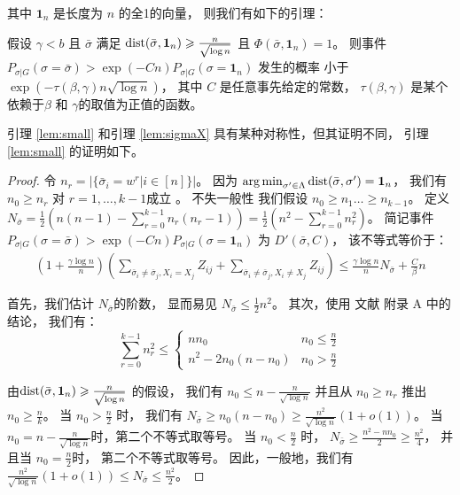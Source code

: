 其中 $\mathbf{1}_n$
是长度为 $n$ 的全1的向量，
则我们有如下的引理：
 \begin{lemma}\label{lem:small}
	假设 $\gamma < b $ 且 $\bar{\sigma}$
  满足 
  $\operatorname{dist}(\bar{\sigma}, \mathbf{1}_n) \geqslant \frac{n}{\sqrt{\log  n}}$
	且 $\Phi(\bar{\sigma}, \mathbf{1}_n)=1$。
	则事件
	$P_{\sigma | G}(\sigma = \bar{\sigma} ) > \exp(-Cn) P_{\sigma | G}(\sigma = \mathbf{1}_n)$
	发生的概率 小于 $\exp(-\tau(\beta, \gamma) n \sqrt{\log  n} )$，
  其中 $C$ 是任意事先给定的常数，
  $\tau(\beta, \gamma)$ 是某个依赖于$\beta$ 和 $\gamma$的取值为正值的函数。
\end{lemma}
引理 \ref{lem:small} 和引理 \ref{lem:sigmaX}  具有某种对称性，但其证明不同，
引理 \ref{lem:small} 的证明如下。
\begin{proof}
	令 $n_r = |\{\bar{\sigma}_i = w^r | i\in [n] \}|$。
  因为 $\operatorname*{arg\,min}_{\sigma'\in \Lambda} \operatorname{dist}(\bar{\sigma}, \sigma') = \mathbf{1}_n$，
  我们有 $n_0 \geq n_r$ 对 $r=1, \dots, k-1$成立 
  。
	不失一般性 我们假设 \mbox{$n_0 \geq n_1 \dots \geq n_{k-1}$}。
	定义
  $N_{\bar{\sigma}} = \frac{1}{2}(n(n-1) - \sum_{r=0}^{k-1} n_r(n_r-1))
	=\frac{1}{2}(n^2 - \sum_{r=0}^{k-1} n_r^2)$。
	简记事件
  $P_{\sigma | G}(\sigma = \bar{\sigma} ) > \exp(-Cn) P_{\sigma | G}(\sigma = \mathbf{1}_n)$ 为
  $D'(\bar{\sigma}, C)$，
	该不等式等价于：
\begin{align}
	\left(1 + \frac{\gamma \log n}{n}\right)
	\left( \sum_{\bar{\sigma}_i  \neq \bar{\sigma}_j, X_i = X_j} Z_{ij} +
	\sum_{\bar{\sigma}_i  \neq \bar{\sigma}_j, X_i \neq X_j} Z_{ij} \right)
	\leq \frac{\gamma \log n}{n} N_{\bar{\sigma}} + \frac{C}{\beta} n\label{eq:small}
\end{align}
		
	首先，我们估计 $N_{\bar{\sigma}}$的阶数，
  显而易见 $N_{\bar{\sigma}} \leq \frac{1}{2} n^2$。
	其次，使用 文献 附录 A 中的结论，
  我们有：
\begin{equation}
	\sum_{r=0}^{k-1} n_r^2 \leq
	\begin{cases}
	n n_0 & n_0 \leq \frac{n}{2} \\
	n^2 - 2n_0(n-n_0) & n_0 > \frac{n}{2}
	\end{cases}
	\end{equation}
	
	由$\operatorname{dist}(\bar{\sigma}, \mathbf{1}_n) \geqslant \frac{n}{\sqrt{\log n}}$
  的假设，
  我们有 $n_0 \leq n - \frac{n}{\sqrt{\log n}}$
	并且从 $n_0 \geq n_r$ 推出 $n_0 \geq \frac{n}{k}$。
	当 $n_0 > \frac{n}{2}$ 时，
	我们有
  $N_{\bar{\sigma}} \geq n_0 (n - n_0) \geq \frac{n^2}{\sqrt{\log n}}(1+o(1))$。
	当 $n_0 = n - \frac{n}{\sqrt{\log n}}$时，第二个不等式取等号。
  当 $n_0 < \frac{n}{2}$ 时，
	$N_{\bar{\sigma}} \geq \frac{n^2 - nn_0}{2} \geq \frac{n^2}{4}$，
  并且当 $n_0 = \frac{n}{2}$时，
  第二个不等式取等号。
	因此，一般地，我们有 $\frac{n^2}{\sqrt{\log n}}(1+o(1)) \leq N_{\bar{\sigma}} \leq \frac{n^2}{2}$。
	

\end{proof}
